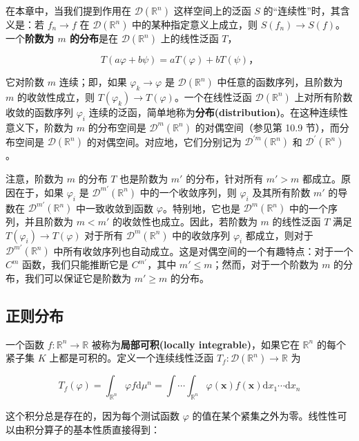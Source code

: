 在本章中，当我们提到作用在 $\mathcal{D}(\mathbb{R}^n)$
这样空间上的泛函 $S$ 的``连续性''时，其含义是：若 $f_n \to f$ 在
$\mathcal{D}(\mathbb{R}^n)$ 中的某种指定意义上成立，则
$S(f_n) \to S(f)$。一个\textbf{阶数为 $m$ 的分布}是在
$\mathcal{D}(\mathbb{R}^n)$ 上的线性泛函 $T$，

$$
T(a\varphi + b\psi) = aT(\varphi) + bT(\psi)，
$$

它对阶数 $m$ 连续；即，如果 $\varphi_k \to \varphi$ 是
$\mathcal{D}(\mathbb{R}^n)$ 中任意的函数序列，且阶数为 $m$
的收敛性成立，则 $T(\varphi_k) \to T(\varphi)$。一个在线性泛函
$\mathcal{D}(\mathbb{R}^n)$ 上对所有阶数收敛的函数序列 $\varphi_i$
连续的泛函，简单地称为\textbf{分布(distribution)}。在这种连续性意义下，阶数为
$m$ 的分布空间是 $\mathcal{D}^m(\mathbb{R}^n)$ 的对偶空间（参见第
10.9 节），而分布空间是 $\mathcal{D}(\mathbb{R}^n)$
的对偶空间。对应地，它们分别记为
$\mathcal{D}^{\prime m}(\mathbb{R}^n)$ 和
$\mathcal{D}^{\prime}(\mathbb{R}^n)$。

注意，阶数为 $m$ 的分布 $T$ 也是阶数为 $m'$ 的分布，针对所有
$m' > m$ 都成立。原因在于，如果 $\varphi_i$ 是
$\mathcal{D}^{m'}(\mathbb{R}^n)$ 中的一个收敛序列，则 $\varphi_i$
及其所有阶数 $m'$ 的导数在 $\mathcal{D}^{m'}(\mathbb{R}^n)$
中一致收敛到函数 $\varphi$。特别地，它也是
$\mathcal{D}^m(\mathbb{R}^n)$ 中的一个序列，并且阶数为 $m < m'$
的收敛性也成立。因此，若阶数为 $m$ 的线性泛函 $T$ 满足
$T(\varphi_i) \to T(\varphi)$ 对于所有 $\mathcal{D}^m(\mathbb{R}^n)$
中的收敛序列 $\varphi_i$ 都成立，则对于
$\mathcal{D}^{m'}(\mathbb{R}^n)$
中所有收敛序列也自动成立。这是对偶空间的一个有趣特点：对于一个 $C^m$
函数，我们只能推断它是 $C^{m'}$，其中
$m' \leq m$；然而，对于一个阶数为 $m$ 的分布，我们可以保证它是阶数为
$m' \geq m$ 的分布。

\subsection{正则分布}

一个函数 $f: \mathbb{R}^n \to \mathbb{R}$
被称为\textbf{局部可积(locally integrable)}，如果它在 $\mathbb{R}^n$
的每个紧子集 $K$ 上都是可积的。定义一个连续线性泛函
$T_f: \mathcal{D}(\mathbb{R}^n) \to \mathbb{R}$ 为

$$
T_f(\varphi) = \int_{\mathbb{R}^n} \varphi f \mathrm{d}\mu^n = \int \cdots \int_{\mathbb{R}^n} \varphi(\mathbf{x}) f(\mathbf{x}) \mathrm{d}x_1 \cdots \mathrm{d}x_n
$$

这个积分总是存在的，因为每个测试函数 $\varphi$
的值在某个紧集之外为零。线性性可以由积分算子的基本性质直接得到：

